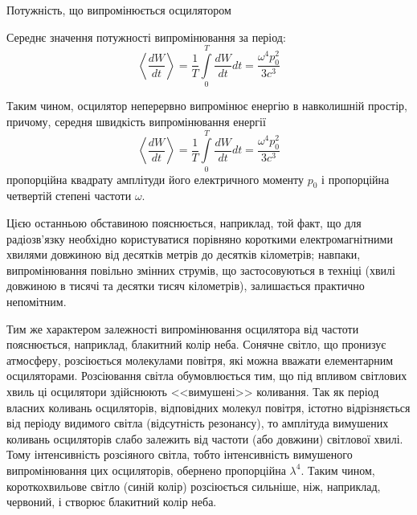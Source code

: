 \documentclass[9pt]{beamer}
\begin{document}
\begin{frame}{Потужність, що випромінюється осцилятором}{}
\begin{overprint}
		Середнє значення потужності випромінювання за період:
		\begin{equation*}
			\left\langle \frac{d W}{dt} \right\rangle = \frac1T\int\limits_0^T \frac{dW}{dt} dt = \frac{\omega^4p_0^2}{3c^3}
		\end{equation*}
		\onslide<3>
		\begin{block}{}\scriptsize\justifying
			Таким чином, осцилятор неперервно випромінює енергію в навколишній простір, причому, середня швидкість випромінювання енергії
			\begin{equation*}
				\left\langle \frac{d W}{dt} \right\rangle = \frac1T\int\limits_0^T \frac{dW}{dt} dt = \frac{\omega^4p_0^2}{3c^3}
			\end{equation*}
			пропорційна квадрату амплітуди його електричного моменту $ p_0 $ і пропорційна четвертій степені частоти $ \omega $.

			\medskip


			Цією останньою обставиною пояснюється, наприклад, той факт, що для радіозв'язку необхідно користуватися порівняно короткими електромагнітними хвилями довжиною від десятків метрів до десятків кілометрів; навпаки, випромінювання повільно змінних струмів, що застосовуються в техніці (хвилі довжиною в тисячі та десятки тисяч кілометрів), залишається практично непомітним.

		\end{block}
        \vspace*{1em}
        \begin{tcolorbox}[enhanced,title={Колір неба},watermark graphics=BlueSky,
        watermark opacity=0.5,watermark color=blue,watermark stretch=1]
        \scriptsize\justifying
			Тим же характером залежності випромінювання осцилятора від
			частоти пояснюється, наприклад, блакитний колір неба. Сонячне світло, що пронизує атмосферу, розсіюється молекулами повітря, які можна вважати елементарним осциляторами. Розсіювання світла обумовлюється тим, що під впливом світлових хвиль ці осцилятори здійснюють <<вимушені>>
			коливання. Так як період власних коливань осциляторів, відповідних молекул повітря, істотно відрізняється від періоду видимого світла (відсутність резонансу), то амплітуда вимушених коливань осциляторів слабо залежить від частоти (або довжини) світлової хвилі. Тому інтенсивність
			розсіяного світла, тобто інтенсивність вимушеного випромінювання
			цих осциляторів, обернено пропорційна $ \lambda^4 $. Таким чином, короткохвильове світло (синій колір) розсіюється сильніше, ніж,
			наприклад, червоний, і створює блакитний колір неба.
		\end{tcolorbox}
	\end{overprint}
\end{frame}
\end{document}
